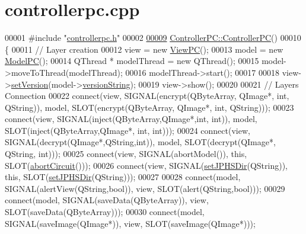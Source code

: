\hypertarget{controllerpc_8cpp_source}{}\section{controllerpc.\+cpp}
\label{controllerpc_8cpp_source}

\begin{DoxyCode}
00001 \textcolor{preprocessor}{#include "\hyperlink{controllerpc_8h}{controllerpc.h}"}
00002 
\hypertarget{controllerpc_8cpp_source.tex_l00009}{}\hyperlink{class_controller_p_c_afa6c92d67bf3b6531c42385fc5938003}{00009} \hyperlink{class_controller_p_c_afa6c92d67bf3b6531c42385fc5938003}{ControllerPC::ControllerPC}()
00010 \{
00011     \textcolor{comment}{// Layer creation}
00012     view = \textcolor{keyword}{new} \hyperlink{class_view_p_c}{ViewPC}();
00013     model = \textcolor{keyword}{new} \hyperlink{class_model_p_c}{ModelPC}();
00014     QThread * modelThread = \textcolor{keyword}{new} QThread();
00015     model->moveToThread(modelThread);
00016     modelThread->start();
00017 
00018     view->\hyperlink{class_view_p_c_ac05220df875b7c4f24405a5742476ebf}{setVersion}(model->\hyperlink{class_model_p_c_a5f426725ccf7eefd3c77ea8c720264c9}{versionString});
00019     view->show();
00020 
00021     \textcolor{comment}{// Layers Connection}
00022     connect(view, SIGNAL(encrypt(QByteArray, QImage*, \textcolor{keywordtype}{int}, QString)), model, SLOT(encrypt(QByteArray, 
      QImage*, \textcolor{keywordtype}{int}, QString)));
00023     connect(view, SIGNAL(inject(QByteArray,QImage*,\textcolor{keywordtype}{int}, \textcolor{keywordtype}{int})), model, SLOT(inject(QByteArray,QImage*, \textcolor{keywordtype}{int}, \textcolor{keywordtype}{
      int})));
00024     connect(view, SIGNAL(decrypt(QImage*,QString,\textcolor{keywordtype}{int})), model, SLOT(decrypt(QImage*, QString, \textcolor{keywordtype}{int})));
00025     connect(view, SIGNAL(abortModel()), \textcolor{keyword}{this}, SLOT(\hyperlink{class_controller_p_c_a8814989f7be1214e06b2e720889066b0}{abortCircuit}()));
00026     connect(view, SIGNAL(\hyperlink{class_controller_p_c_ac00d29685a7e5b780c01eb438e10f96d}{setJPHSDir}(QString)), \textcolor{keyword}{this}, SLOT(\hyperlink{class_controller_p_c_ac00d29685a7e5b780c01eb438e10f96d}{setJPHSDir}(QString)));
00027 
00028     connect(model, SIGNAL(alertView(QString,\textcolor{keywordtype}{bool})), view, SLOT(alert(QString,\textcolor{keywordtype}{bool})));
00029     connect(model, SIGNAL(saveData(QByteArray)), view, SLOT(saveData(QByteArray)));
00030     connect(model, SIGNAL(saveImage(QImage*)), view, SLOT(saveImage(QImage*)));

\end{DoxyCode}
